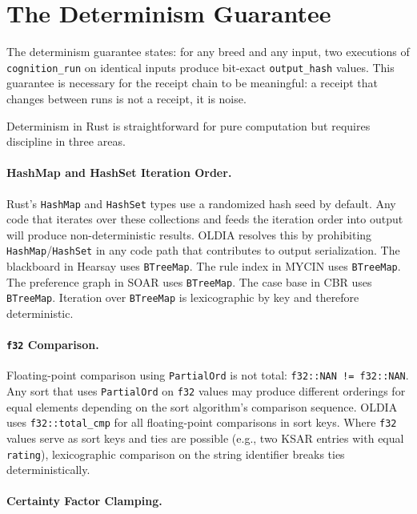 \section{The Determinism Guarantee}
\label{sec:determinism}

The determinism guarantee states: for any breed and any input, two executions of \texttt{cognition\_run} on identical inputs produce bit-exact \texttt{output\_hash} values. This guarantee is necessary for the receipt chain to be meaningful: a receipt that changes between runs is not a receipt, it is noise.

Determinism in Rust is straightforward for pure computation but requires discipline in three areas.

\paragraph{HashMap and HashSet Iteration Order.}

Rust's \texttt{HashMap} and \texttt{HashSet} types use a randomized hash seed by default. Any code that iterates over these collections and feeds the iteration order into output will produce non-deterministic results. OLDIA resolves this by prohibiting \texttt{HashMap}/\texttt{HashSet} in any code path that contributes to output serialization. The blackboard in Hearsay uses \texttt{BTreeMap}. The rule index in MYCIN uses \texttt{BTreeMap}. The preference graph in SOAR uses \texttt{BTreeMap}. The case base in CBR uses \texttt{BTreeMap}. Iteration over \texttt{BTreeMap} is lexicographic by key and therefore deterministic.

\paragraph{\texttt{f32} Comparison.}

Floating-point comparison using \texttt{PartialOrd} is not total: \texttt{f32::NAN != f32::NAN}. Any sort that uses \texttt{PartialOrd} on \texttt{f32} values may produce different orderings for equal elements depending on the sort algorithm's comparison sequence. OLDIA uses \texttt{f32::total\_cmp} for all floating-point comparisons in sort keys. Where \texttt{f32} values serve as sort keys and ties are possible (e.g., two KSAR entries with equal \texttt{rating}), lexicographic comparison on the string identifier breaks ties deterministically.

\paragraph{Certainty Factor Clamping.}

